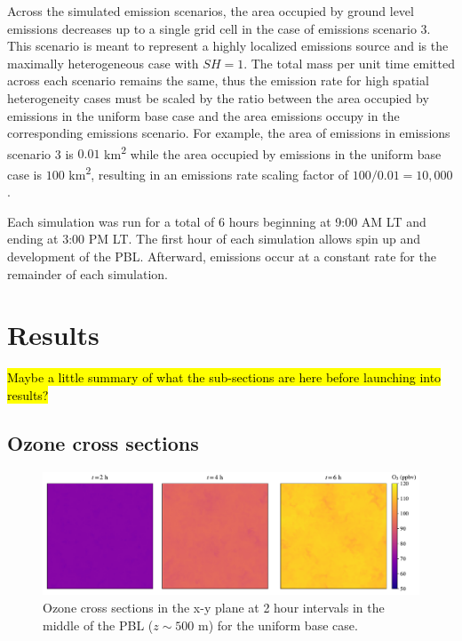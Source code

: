 Across the simulated emission scenarios, the area occupied by ground level emissions decreases up to a single grid cell in the case of emissions scenario 3. This scenario is meant to represent a highly localized emissions source and is the maximally heterogeneous case with $SH=1$. The total mass per unit time emitted across each scenario remains the same, thus the emission rate for high spatial heterogeneity cases must be scaled by the ratio between the area occupied by emissions in the uniform base case and the area emissions occupy in the corresponding emissions scenario. For example, the area of emissions in emissions scenario 3 is $0.01$ \si{km^2} while the area occupied by emissions in the uniform base case is  $100$ \si{km^2}, resulting in an emissions rate scaling factor of $100/0.01 = 10,000$. 

Each simulation was run for a total of 6 hours beginning at 9:00 AM LT and ending at 3:00 PM LT. The first hour of each simulation allows spin up and development of the PBL. Afterward, emissions occur at a constant rate for the remainder of each simulation.

\section{Results}

\hl{Maybe a little summary of what the sub-sections are here before launching into results?}

\subsection{Ozone cross sections}

\begin{figure}[h]
    \centering
    \includegraphics[width=\textwidth]{figures/chapter4/o3-crosssec-uniform-basecase-z25.pdf}
    \caption{Ozone cross sections in the x-y plane at 2 hour intervals in the middle of the PBL ($z\sim500$ \si{m}) for the uniform base case.}
    \label{fig:o3-crosssec-ub}
  \end{figure}

